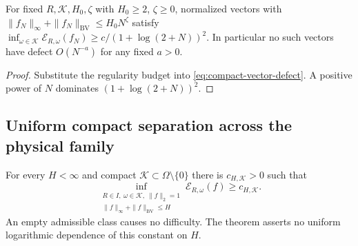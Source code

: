 \begin{corollary}
\label{cor:polynomial-bv-vector-budget}
For fixed $R,\mathcal K,H_0,\zeta$ with $H_0\ge2$, $\zeta\ge0$,
normalized vectors with
$\|f_N\|_\infty+\|f_N\|_{\mathrm{BV}}\le H_0N^\zeta$
satisfy $\inf_{\omega\in\mathcal K}\mathcal E_{R,\omega}(f_N)
\ge c/(1+\log(2+N))^2$. In particular no such vectors have defect
$O(N^{-a})$ for any fixed $a>0$.
\end{corollary}
\begin{proof}
Substitute the regularity budget into
\eqref{eq:compact-vector-defect}. A positive power of $N$ dominates
$(1+\log(2+N))^2$.
\end{proof}

\subsection{Uniform compact separation across the physical family}
\begin{theorem}
\label{thm:uniform-compact-bv-separation}
For every $H<\infty$ and compact
$\mathcal K\subset\Omega\setminus\{0\}$ there is
$c_{H,\mathcal K}>0$ such that
\begin{equation}\label{eq:uniform-compact-bv-separation}
 \inf_{\substack{R\in I,\ \omega\in\mathcal K,\ \|f\|_2=1\\
                \|f\|_\infty+\|f\|_{\mathrm{BV}}\le H}}
          \mathcal E_{R,\omega}(f)\ge c_{H,\mathcal K}.
\end{equation}
An empty admissible class causes no difficulty. The theorem asserts
no uniform logarithmic dependence of this constant on $H$.
\end{theorem}
